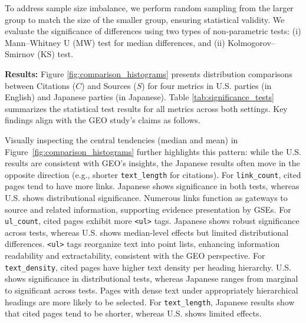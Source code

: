 To address sample size imbalance, we perform random sampling from the larger group to match the size of the smaller group, ensuring statistical validity.
We evaluate the significance of differences using two types of non-parametric tests:
(i) Mann--Whitney U (MW) test for median differences, and (ii) Kolmogorov--Smirnov (KS) test.

\textbf{Results: }
\label{subsec:web_results}
Figure \ref{fig:comparison_histograms} presents distribution comparisons between Citations ($ C $) and Sources ($ S $) for four metrics in U.S. parties (in English) and Japanese parties (in Japanese).
Table \ref{tab:significance_tests} summarizes the statistical test results for all metrics across both settings.
Key findings align with the GEO study's claims as follows.

Visually inspecting the central tendencies (median and mean) in Figure~\ref{fig:comparison_histograms} further highlights this pattern: while the U.S. results are consistent with GEO's insights, the Japanese results often move in the opposite direction (e.g., shorter \texttt{text\_length} for citations).
For \texttt{link\_count}, cited pages tend to have more links.
Japanese shows significance in both tests, whereas U.S. shows distributional significance.
Numerous links function as gateways to source and related information, supporting evidence presentation by GSEs.
For \texttt{ul\_count}, cited pages exhibit more \texttt{<ul>} tags.
Japanese shows robust significance across tests, whereas U.S. shows median-level effects but limited distributional differences.
\texttt{<ul>} tags reorganize text into point lists, enhancing information readability and extractability, consistent with the GEO perspective.
For \texttt{text\_density}, cited pages have higher text density per heading hierarchy.
U.S. shows significance in distributional tests, whereas Japanese ranges from marginal to significant across tests.
Pages with dense text under appropriately hierarchical headings are more likely to be selected.
For \texttt{text\_length}, Japanese results show that cited pages tend to be shorter,
whereas U.S. shows limited effects.

